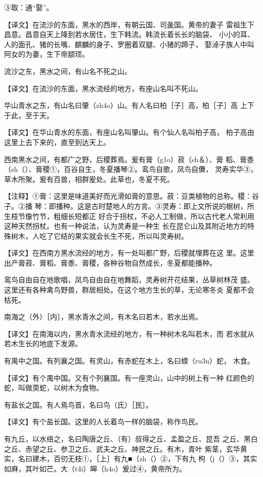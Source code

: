 \documentclass[a4paper,12pt,UTF8,twoside]{ctexbook}
\begin{document}
③取：通“娶”。

【译文】在流沙的东面，黑水的西岸，有朝云国、司彘国。黄帝的妻子 雷祖生下昌意。昌意自天上降到若水居住，生下韩流。韩流长着长长的脑袋、 小小的耳、人的面孔、猪的长嘴、麒麟的身子、罗圈着双腿、小猪的蹄子， 娶淖子族人中叫阿女的为妻，生下帝颛顼。

流沙之东，黑水之间，有山名不死之山。

【译文】在流沙的东面，黑水流经的地方，有座山名叫不死山。

华山青水之东，有山名曰肇（zh4o）山。有人名曰柏［子］高，柏［子］高 上下于此，至于天。

【译文】在华山青水的东面，有座山名叫肇山。有个仙人名叫柏子高， 柏子高由这里上去下来的，直至到达天上。

西南黑水之间，有都广之野，后稷葬焉。爰有膏（g1o）菽（sh＆）、膏 稻、膏黍（sh（）、膏稷①，百谷自生，冬夏播琴②。鸾鸟自歌，凤鸟自儛， 灵寿实华③，草木所聚。爰有百兽，相群爰处。此草也，冬夏不死。

【注释】①膏：这里是味道美好而光滑如膏的意思。菽：豆类植物的总称。稷：谷子。②播 琴：即播种。这是古时楚地人的方言。③灵寿：即上文所说的椐树，所生枝节像竹节，粗细长短都正 好合于拐杖，不必人工制做，所以古代老人常利用这种天然拐杖。也有一种说法，认为灵寿是一种生 长在昆仑山及其附近地方的特殊树木，人吃了它结的果实就会长生不死，所以叫灵寿树。

【译文】在西南方黑水流经的地方，有一处叫都广野，后稷就埋葬在这 里。这里出产膏菽、膏稻、膏黍、膏稷，各种谷物自然成长，冬夏都能播种。

鸾鸟自由自在地歌唱，凤鸟自由自在地舞蹈，灵寿树开花结果，丛草树林茂 盛。这里还有各种禽鸟野兽，群居相处。在这个地方生长的草，无论寒冬炎 夏都不会枯死。

南海之（外）［内］，黑水青水之间，有木名曰若木，若水出焉。

【译文】在南海以内，黑水青水流经的地方，有一种树木名叫若木，而 若水就从若木生长的地底下发源。

有禺中之国。有列襄之国。有灵山，有赤蛇在木上，名曰蝡（ru3n）蛇， 木食。

【译文】有个禺中国。又有个列襄国。有一座灵山，山中的树上有一种 红颜色的蛇，叫做耎蛇，以树木为食物。

有盐长之国。有人焉鸟首，名曰鸟（氏）［民］。

【译文】有个盐长国。这里的人长着鸟一样的脑袋，称作鸟民。

有九丘，以水络之，名曰陶唐之丘、（有）叔得之丘、孟盈之丘、昆吾 之丘、黑白之丘、赤望之丘、参卫之丘、武夫之丘、神民之丘。有木，青叶 紫茎，玄华黄实，名曰建木，百仞无枝①，［上］有九■（zh（）②，下有九 枸（j（）③，其实如麻，其叶如芒。大（t4i）皞（h4o）爰过④，黄帝所为。
\end{document}
